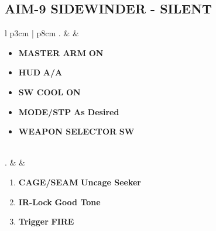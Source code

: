 \documentclass[8pt,usenames,dvipsnames,twoside]{article}
\begin{document}
	\subsection{AIM-9 SIDEWINDER - SILENT}
	\begin{center}
		\begin{tabular}{l p{3cm} | p{8cm}}
			. &  &
			\begin{minipage}[t]{\linewidth}
				\vspace{-7pt}
				\begin{itemize}
					\item \textbf{MASTER ARM} \dotfill \textbf{ON}
					\item \textbf{HUD} \dotfill \textbf{A/A}
					\item \textbf{SW COOL} \dotfill \textbf{ON}
					\item \textbf{MODE/STP} \dotfill \textbf{As Desired}
					\item \textbf{WEAPON SELECTOR} \dotfill \textbf{SW}
				\end{itemize}
			\end{minipage} \\
			. &  &
			\begin{minipage}[t]{\linewidth}
				\vspace{-7pt}
				\begin{enumerate}
					\item \textbf{CAGE/SEAM} \dotfill \textbf{Uncage Seeker}
					\item \textbf{IR-Lock} \dotfill \textbf{Good Tone}
					\item \textbf{Trigger} \dotfill \textbf{FIRE}
				\end{enumerate}
			\end{minipage} \\
			\bottomrule
		\end{tabular}
	\end{center}
\end{document}
